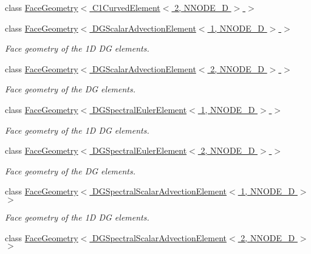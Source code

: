 \begin{DoxyCompactItemize}
class \hyperlink{classoomph_1_1FaceGeometry_3_01C1CurvedElement_3_012_00_01NNODE__1D_01_4_01_4}{Face\+Geometry$<$ C1\+Curved\+Element$<$ 2, N\+N\+O\+D\+E\+\_\+D $>$ $>$}
\item 
class \hyperlink{classoomph_1_1FaceGeometry_3_01DGScalarAdvectionElement_3_011_00_01NNODE__1D_01_4_01_4}{Face\+Geometry$<$ D\+G\+Scalar\+Advection\+Element$<$ 1, N\+N\+O\+D\+E\+\_\+D $>$ $>$}
\begin{DoxyCompactList}\small\item\em Face geometry of the 1D DG elements. \end{DoxyCompactList}\item 
class \hyperlink{classoomph_1_1FaceGeometry_3_01DGScalarAdvectionElement_3_012_00_01NNODE__1D_01_4_01_4}{Face\+Geometry$<$ D\+G\+Scalar\+Advection\+Element$<$ 2, N\+N\+O\+D\+E\+\_\+D $>$ $>$}
\begin{DoxyCompactList}\small\item\em Face geometry of the DG elements. \end{DoxyCompactList}\item 
class \hyperlink{classoomph_1_1FaceGeometry_3_01DGSpectralEulerElement_3_011_00_01NNODE__1D_01_4_01_4}{Face\+Geometry$<$ D\+G\+Spectral\+Euler\+Element$<$ 1, N\+N\+O\+D\+E\+\_\+D $>$ $>$}
\begin{DoxyCompactList}\small\item\em Face geometry of the 1D DG elements. \end{DoxyCompactList}\item 
class \hyperlink{classoomph_1_1FaceGeometry_3_01DGSpectralEulerElement_3_012_00_01NNODE__1D_01_4_01_4}{Face\+Geometry$<$ D\+G\+Spectral\+Euler\+Element$<$ 2, N\+N\+O\+D\+E\+\_\+D $>$ $>$}
\begin{DoxyCompactList}\small\item\em Face geometry of the DG elements. \end{DoxyCompactList}\item 
class \hyperlink{classoomph_1_1FaceGeometry_3_01DGSpectralScalarAdvectionElement_3_011_00_01NNODE__1D_01_4_01_4}{Face\+Geometry$<$ D\+G\+Spectral\+Scalar\+Advection\+Element$<$ 1, N\+N\+O\+D\+E\+\_\+D $>$ $>$}
\begin{DoxyCompactList}\small\item\em Face geometry of the 1D DG elements. \end{DoxyCompactList}\item 
class \hyperlink{classoomph_1_1FaceGeometry_3_01DGSpectralScalarAdvectionElement_3_012_00_01NNODE__1D_01_4_01_4}{Face\+Geometry$<$ D\+G\+Spectral\+Scalar\+Advection\+Element$<$ 2, N\+N\+O\+D\+E\+\_\+D $>$ $>$}

\end{DoxyCompactItemize}
